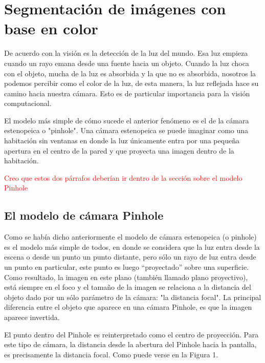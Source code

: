 \documentclass{book}
\begin{document}
\chapter{ Segmentación de imágenes con base en color}
De acuerdo con \cite{bradski2008learning} la visión es la detección de la luz del mundo. Esa luz empieza cuando un rayo emana desde una fuente hacia un objeto. Cuando la luz choca con el objeto, mucha de la luz es absorbida y la que no es absorbida, nosotros la podemos percibir como el color de la luz, de esta manera, la luz reflejada hace su camino hacia nuestra cámara. Esto es de particular importancia para la visión computacional.
		
El modelo más simple de cómo sucede el anterior fenómeno es el de la cámara estenopeica o "pinhole". Una cámara estenopeica se puede imaginar como una habitación sin ventanas en donde la luz únicamente entra por una pequeña apertura en el centro de la pared y que proyecta una imagen dentro de la habitación.

\textcolor{red}{Creo que estos dos párrafos deberían ir dentro de la sección sobre el modelo Pinhole}


\section{El modelo de cámara Pinhole}
Como se había dicho anteriormente el modelo de cámara estenopeica (o pinhole) es el modelo más simple de todos, en donde se considera que la luz entra desde la escena o desde un punto un punto distante, pero sólo un rayo de luz entra desde un punto en particular, este punto es luego “proyectado” sobre una superficie. Como resultado, la imagen en este plano (también llamado plano proyectivo), está siempre en el foco y el tamaño de la imagen se relaciona a la distancia del objeto dado por un sólo parámetro de la cámara: "la distancia focal". La principal diferencia entre el objeto que aparece en una cámara Pinhole, es que la imagen aparece invertida. 
	
El punto dentro del Pinhole es reinterpretado como el centro de proyección. Para este tipo de cámara, la distancia desde la abertura del Pinhole hacia la pantalla, es precisamente la distancia focal. Como puede verse en la Figura 1.\\
	
\end{document}

